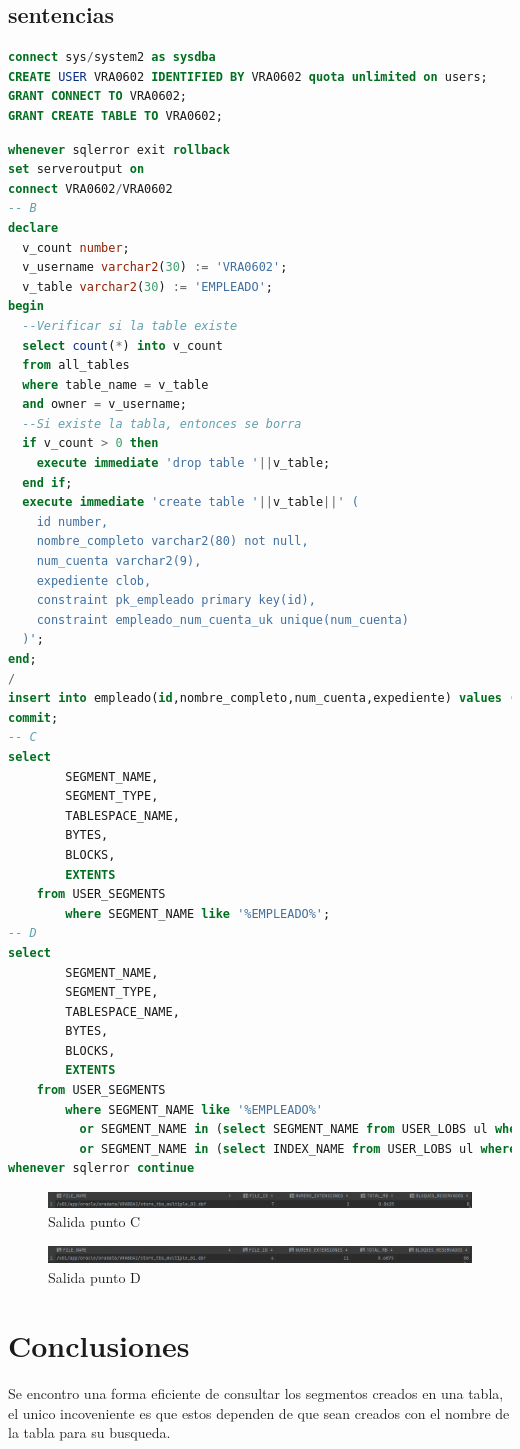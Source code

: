 \documentclass[journal]{IEEEtran}
\begin{document}
\subsection{sentencias}
\begin{lstlisting}[language=sql, caption=s-00-crea-usuario.sql,label={lst:codigo1}]
connect sys/system2 as sysdba
CREATE USER VRA0602 IDENTIFIED BY VRA0602 quota unlimited on users;
GRANT CONNECT TO VRA0602;
GRANT CREATE TABLE TO VRA0602;
\end{lstlisting}
\begin{lstlisting}[language=sql, caption=s-01-crear-tabla.sql,label={lst:codigo2}]
whenever sqlerror exit rollback
set serveroutput on
connect VRA0602/VRA0602
-- B
declare
  v_count number;
  v_username varchar2(30) := 'VRA0602';
  v_table varchar2(30) := 'EMPLEADO';
begin
  --Verificar si la table existe
  select count(*) into v_count
  from all_tables
  where table_name = v_table
  and owner = v_username;
  --Si existe la tabla, entonces se borra
  if v_count > 0 then
    execute immediate 'drop table '||v_table;
  end if;
  execute immediate 'create table '||v_table||' (
    id number,
    nombre_completo varchar2(80) not null,
    num_cuenta varchar2(9),
    expediente clob,
    constraint pk_empleado primary key(id),
    constraint empleado_num_cuenta_uk unique(num_cuenta)
  )';
end;
/
insert into empleado(id,nombre_completo,num_cuenta,expediente) values (1,'Vicente Romero Andrade','312097792',null);
commit;
-- C
select 
        SEGMENT_NAME, 
        SEGMENT_TYPE, 
        TABLESPACE_NAME,
        BYTES,
        BLOCKS,
        EXTENTS 
    from USER_SEGMENTS 
        where SEGMENT_NAME like '%EMPLEADO%';
-- D
select
        SEGMENT_NAME,
        SEGMENT_TYPE,
        TABLESPACE_NAME,
        BYTES,
        BLOCKS,
        EXTENTS
    from USER_SEGMENTS
        where SEGMENT_NAME like '%EMPLEADO%'
          or SEGMENT_NAME in (select SEGMENT_NAME from USER_LOBS ul where ul.TABLE_NAME = 'EMPLEADO')
          or SEGMENT_NAME in (select INDEX_NAME from USER_LOBS ul where ul.TABLE_NAME = 'EMPLEADO');
whenever sqlerror continue
\end{lstlisting}
\begin{figure}[H]
  \centering
  \includegraphics[scale=.22]{captura_1.png}
   \caption{Salida punto C}
   \label{fig:validador_1}
\end{figure}
\begin{figure}[H]
  \centering
  \includegraphics[scale=.22]{captura_2.png}
   \caption{Salida punto D}
   \label{fig:validador_2}
\end{figure}

\section{Conclusiones}
Se encontro una forma eficiente de consultar los segmentos creados en una tabla, 
el unico incoveniente es que estos dependen de que sean creados con el nombre de la tabla 
para su busqueda.
\ifCLASSOPTIONcaptionsoff
  \newpage

\fi
\end{document}
